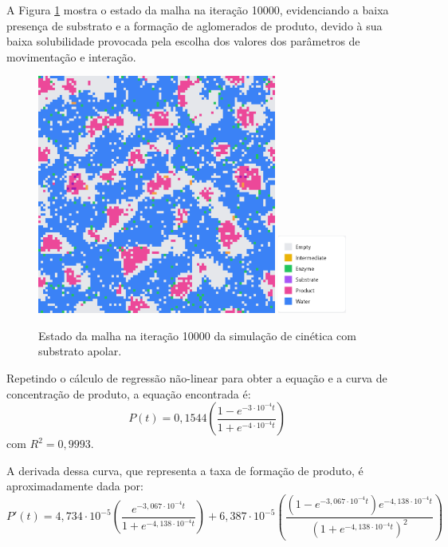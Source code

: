 \documentclass[12pt,oneside]{report}
\begin{document}
A Figura \ref{fig:MM_apolar_10000it} mostra o estado da malha na iteração 10000, evidenciando a baixa presença de substrato e a formação de aglomerados de produto, devido à sua baixa solubilidade provocada pela escolha dos valores dos parâmetros de movimentação e interação.

\begin{figure}[H]
    \centering
    \includegraphics[width=0.7\textwidth]{img/apolar_10000.png}
    \hspace{0.05\textwidth}
    \includegraphics[width=0.2\textwidth]{img/legend.png}
    \caption{\small Estado da malha na iteração 10000 da simulação de cinética com substrato apolar.}
    \label{fig:MM_apolar_10000it}
\end{figure}

Repetindo o cálculo de regressão não-linear para obter a equação e a curva de concentração de produto, a equação encontrada é:
\begin{equation}
    P(t) = 0{,}1544 \left(\frac{1 - e^{-3 \cdot 10^{-4} t}}{1 + e^{-4 \cdot 10^{-4} t}}\right)
    \label{eq:produto_MM_apolar}
\end{equation}
com $R^2 = 0{,}9993$.

A derivada dessa curva, que representa a taxa de formação de produto, é aproximadamente dada por:
\begin{equation}
    P'(t) = 4{,}734 \cdot 10^{-5} \left(\frac{e^{-3{,}067 \cdot 10^{-4} t}}{1 + e^{-4{,}138 \cdot 10^{-4} t}}\right) + 6{,}387 \cdot 10^{-5} \left(\frac{(1 - e^{-3{,}067 \cdot 10^{-4} t}) e^{-4{,}138 \cdot 10^{-4} t}}{(1 + e^{-4{,}138 \cdot 10^{-4} t})^2}\right)
    \label{eq:taxa_MM_apolar}
\end{equation}
\end{document}
